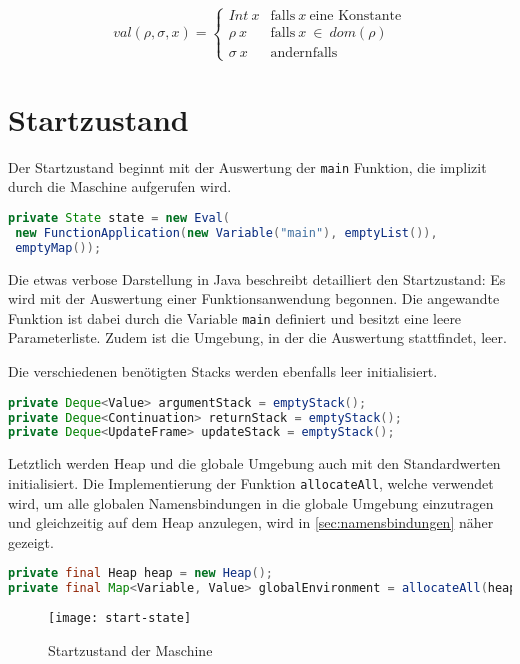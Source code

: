 \[
  val(\rho, \sigma, x) =
    \begin{cases}
      Int\ x & \text{falls}\ x\ \text{eine Konstante} \\
      \rho\ x & \text{falls}\ x\ \in\ dom(\rho) \\
      \sigma\ x & \text{andernfalls}
    \end{cases}
\]


\section{Startzustand}

Der Startzustand beginnt mit der Auswertung der \texttt{main} Funktion, die implizit durch die Maschine aufgerufen wird.

\begin{lstlisting}[language=Java]
private State state = new Eval(
 new FunctionApplication(new Variable("main"), emptyList()),
 emptyMap());
\end{lstlisting}

Die etwas verbose Darstellung in Java beschreibt detailliert den Startzustand:
Es wird mit der Auswertung einer Funktionsanwendung begonnen.
Die angewandte Funktion ist dabei durch die Variable \texttt{main} definiert und besitzt eine leere Parameterliste.
Zudem ist die Umgebung, in der die Auswertung stattfindet, leer.

Die verschiedenen benötigten Stacks werden ebenfalls leer initialisiert.

\begin{lstlisting}[language=java]
private Deque<Value> argumentStack = emptyStack();
private Deque<Continuation> returnStack = emptyStack();
private Deque<UpdateFrame> updateStack = emptyStack();
\end{lstlisting}

Letztlich werden Heap und die globale Umgebung auch mit den Standardwerten initialisiert.
Die Implementierung der Funktion \texttt{allocateAll}, welche verwendet wird, um alle globalen Namensbindungen in die globale Umgebung einzutragen und gleichzeitig auf dem Heap anzulegen, wird in \ref{sec:namensbindungen} näher gezeigt.

\begin{lstlisting}[language=java]
private final Heap heap = new Heap();
private final Map<Variable, Value> globalEnvironment = allocateAll(heap, program.bindings, emptyMap(), true);
\end{lstlisting}


\begin{figure}
  \centering
  \texttt{[image: start-state]}
  \caption{Startzustand der Maschine}\label{fig:start-state}
\end{figure}

